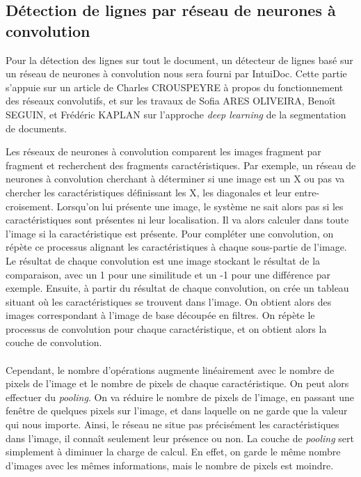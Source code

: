 \subsection{Détection de lignes par réseau de neurones à convolution}

Pour la détection des lignes sur tout le document, un détecteur de lignes basé sur un réseau de neurones à convolution nous sera
fourni par IntuiDoc. Cette partie s'appuie sur un article de Charles CROUSPEYRE à propos du fonctionnement des réseaux convolutifs,
et sur les travaux de Sofia ARES OLIVEIRA, Benoît SEGUIN, et Frédéric KAPLAN sur l’approche \textit{deep learning} de la segmentation
de documents. 

Les réseaux de neurones à convolution comparent les images fragment par fragment et recherchent des fragments caractéristiques.
Par exemple, un réseau de neurones à convolution cherchant à déterminer si une image est un X ou pas va chercher les caractéristiques
définissant les X, les diagonales et leur entre-croisement. Lorsqu'on lui présente une image, le système ne sait alors pas si les
caractéristiques sont présentes ni leur localisation. Il va alors calculer dans toute l'image si la caractéristique est présente.
Pour compléter une convolution, on répète ce processus alignant les caractéristiques à chaque sous-partie de l'image.
Le résultat de chaque convolution est une image stockant le résultat de la comparaison, avec un 1 pour une similitude et un -1
pour une différence par exemple. Ensuite, à partir du résultat de chaque convolution, on crée un tableau situant où les
caractéristiques se trouvent dans l'image. On obtient alors des images correspondant à l'image de base découpée en filtres.
On répète le processus de convolution pour chaque caractéristique, et on obtient alors la couche de convolution.

\paragraph{}
Cependant, le nombre d'opérations augmente linéairement avec le nombre de pixels de l'image et le
nombre de pixels de chaque caractéristique. On peut alors effectuer du \textit{pooling}. On va
réduire le nombre de pixels de l'image, en passant une fenêtre de quelques pixels sur l'image,
et dans laquelle on ne garde que la valeur qui nous importe. Ainsi, le réseau ne situe pas précisément
les caractéristiques dans l'image, il connaît seulement leur présence ou non. La couche de
\textit{pooling} sert simplement à diminuer la charge de calcul. En effet, on garde le même nombre
d'images avec les mêmes informations, mais le nombre de pixels est moindre.

